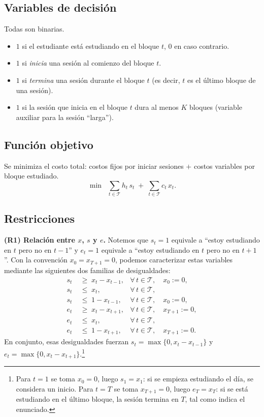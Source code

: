 \documentclass{article}
\begin{document}
\subsection*{Variables de decisi\'on}
Todas son binarias.
\begin{itemize}[leftmargin=2cm]
    \item[$x_t$:] $1$ si el estudiante est\'a estudiando en el bloque $t$, $0$ en caso contrario.
    \item[$s_t$:] $1$ si \emph{inicia} una sesi\'on al comienzo del bloque $t$.
    \item[$e_t$:] $1$ si \emph{termina} una sesi\'on durante el bloque $t$ (es decir, $t$ es el \'ultimo bloque de una sesi\'on).
    \item[$z_t$:] $1$ si la sesi\'on que inicia en el bloque $t$ dura al menos $K$ bloques (variable auxiliar para la sesi\'on ``larga'').
\end{itemize}

\subsection*{Funci\'on objetivo}
Se minimiza el costo total: costos fijos por iniciar sesiones $+$ costos variables por bloque estudiado.
\[
\min \;\; \sum_{t\in\mathcal{T}} h_t\, s_t \;+\; \sum_{t\in\mathcal{T}} c_t\, x_t.
\]

\subsection*{Restricciones}

\medskip
\noindent\textbf{(R1) Relaci\'on entre $x$, $s$ y $e$.}  Notemos que $s_t=1$ equivale a ``estoy estudiando en $t$ pero no en $t-1$'' y $e_t=1$ equivale a ``estoy estudiando en $t$ pero no en $t+1$''. Con la convenci\'on $x_0=x_{T+1}=0$, podemos caracterizar estas variables mediante las siguientes dos familias de desigualdades:
\begin{align}
s_t &\;\geq\; x_t - x_{t-1}, & \forall\, t\in\mathcal{T}, \quad x_0 := 0, \label{eq:si1}\\
s_t &\;\leq\; x_t,            & \forall\, t\in\mathcal{T}, \label{eq:si2}\\
s_t &\;\leq\; 1 - x_{t-1},    & \forall\, t\in\mathcal{T}, \quad x_0 := 0, \label{eq:si3}\\
e_t &\;\geq\; x_t - x_{t+1}, & \forall\, t\in\mathcal{T}, \quad x_{T+1} := 0, \label{eq:ei1}\\
e_t &\;\leq\; x_t,            & \forall\, t\in\mathcal{T}, \label{eq:ei2}\\
e_t &\;\leq\; 1 - x_{t+1},    & \forall\, t\in\mathcal{T}, \quad x_{T+1} := 0. \label{eq:ei3}
\end{align}
En conjunto, esas desigualdades fuerzan $s_t = \max\{0, x_t - x_{t-1}\}$ y $e_t = \max\{0, x_t - x_{t+1}\}$.\footnote{Para $t=1$ se toma $x_0=0$, luego $s_1 = x_1$: si se empieza estudiando el d\'ia, se considera un inicio. Para $t=T$ se toma $x_{T+1}=0$, luego $e_T=x_T$: si se est\'a estudiando en el \'ultimo bloque, la sesi\'on termina en $T$, tal como indica el enunciado.}
\end{document}

